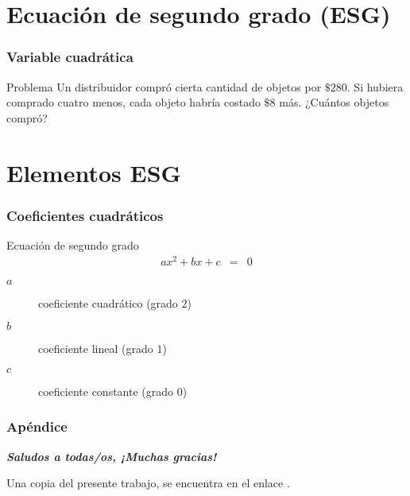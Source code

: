 \documentclass[12pt,spanish,x11names]{beamer}
\title{\talktitle}
\subtitle{\talksubtitle}
\author{\talkauthor}
\institute{\talkaffiliation}
\date{\footnotesize{\emph{\href{\talkblog}{\talkemail}}}}
\def\talktitle{Ecuación de Segundo Grado}
\def\talkpubpdf{https://github.com/hsigrist/LMLA/blob/b3ee3cf0a7fda2d4ee27a545bcb482b6cf780d33/3TP/TALKS/ECUACION-SEGUNDO-GRADO-3TP.pdf}
\newcommand{\framedhref}[2]{\href{#1}{\fcolorbox{bluu}{bluu}{\textcolor{white}{#2}}}}
\begin{document}
\begin{frame}
\titlepage
\end{frame}
\section{Ecuación de segundo grado (ESG)}
\begin{frame}
  \frametitle{Variable cuadrática}
  \begin{exampleblock}{Problema}
    Un distribuidor compró cierta cantidad de objetos por $\$280$. Si hubiera
    comprado cuatro menos, cada objeto habría costado $\$8$ más. ¿Cuántos
    objetos compró?
  \end{exampleblock}
\end{frame}
\section{Elementos ESG}
\begin{frame}
  \frametitle{Coeficientes cuadráticos}
  \begin{block}{Ecuación de segundo grado}
    \begin{eqnarray}
      \label{eq:1}
      ax^2+bx+c&=&0
    \end{eqnarray}
    \begin{description}
    \item[$a$] coeficiente cuadrático (grado $2$)
    \item[$b$] coeficiente lineal (grado $1$)
    \item[$c$] coeficiente constante (grado $0$)
    \end{description}
  \end{block}
\end{frame}
\begin{frame}[c]\frametitle{Apéndice}
\centering\decofourleft\quad\decofourright

\textbf{\emph {Saludos a todas/os, ¡Muchas gracias!}}

Una copia del presente trabajo, se encuentra en el enlace \framedhref{\talkpubpdf}{\talktitle}.

\end{frame}
\end{document}
